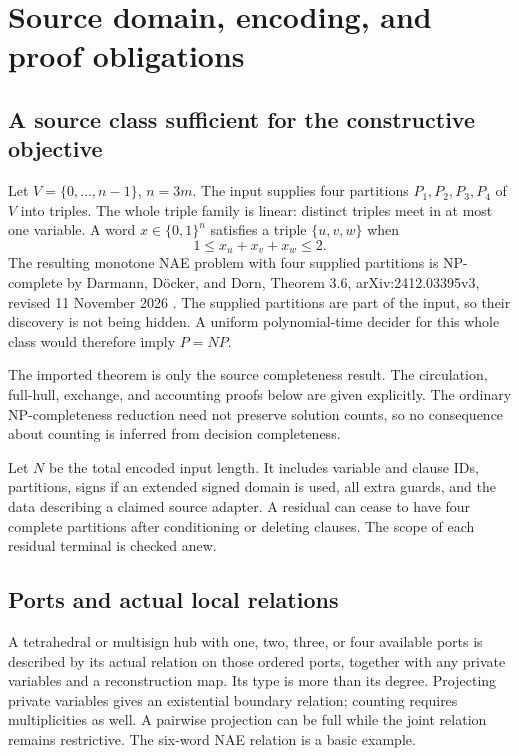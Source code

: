 \documentclass[11pt,letterpaper]{article}
\theoremstyle{definition}
\begin{document}
\section{Source domain, encoding, and proof obligations}

\subsection{A source class sufficient for the constructive objective}

Let $V=\{0,\ldots,n-1\}$, $n=3m$. The input supplies four partitions $P_1,P_2,P_3,P_4$ of $V$ into triples. The whole triple family is linear: distinct triples meet in at most one variable. A word $x\in\{0,1\}^n$ satisfies a triple $\{u,v,w\}$ when
\[
1\le x_u+x_v+x_w\le2.
\]
The resulting monotone NAE problem with four supplied partitions is NP-complete by Darmann, D\"ocker, and Dorn, Theorem 3.6, arXiv:2412.03395v3, revised 11 November 2026 \cite{ddd}. The supplied partitions are part of the input, so their discovery is not being hidden. A uniform polynomial-time decider for this whole class would therefore imply $P=NP$.

The imported theorem is only the source completeness result. The circulation, full-hull, exchange, and accounting proofs below are given explicitly. The ordinary NP-completeness reduction need not preserve solution counts, so no consequence about counting is inferred from decision completeness.

Let $N$ be the total encoded input length. It includes variable and clause IDs, partitions, signs if an extended signed domain is used, all extra guards, and the data describing a claimed source adapter. A residual can cease to have four complete partitions after conditioning or deleting clauses. The scope of each residual terminal is checked anew.

\subsection{Ports and actual local relations}

A tetrahedral or multisign hub with one, two, three, or four available ports is described by its actual relation on those ordered ports, together with any private variables and a reconstruction map. Its type is more than its degree. Projecting private variables gives an existential boundary relation; counting requires multiplicities as well. A pairwise projection can be full while the joint relation remains restrictive. The six-word NAE relation is a basic example.
\end{document}
